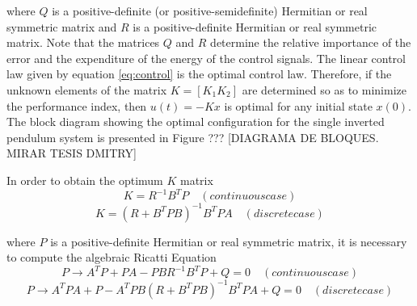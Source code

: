 where $Q$ is a positive-definite (or positive-semidefinite) Hermitian or real symmetric matrix and $R$ is a positive-definite Hermitian or real symmetric matrix. Note that the matrices $Q$ and $R$ determine the relative importance of the error and the expenditure of the energy of the control signals.
The linear control law given by equation \ref{eq:control} is the optimal control law. Therefore, if the unknown elements of the matrix $K = [K_1 K_2]$ are determined so as to minimize the performance index, then $u(t) = -Kx$ is optimal for any initial state $x(0)$. The block diagram showing the optimal configuration for the single inverted pendulum system is presented in Figure ??? [DIAGRAMA DE BLOQUES. MIRAR TESIS DMITRY]

In order to obtain the optimum $K$ matrix
\begin{equation}
K = R^{-1}B^{T}P \quad (continuous case)
\end{equation}
\begin{equation}
K = (R + B^{T}PB)^{-1}B^{T}PA \quad (discrete case)
\end{equation}


where $P$ is a positive-definite Hermitian or real symmetric matrix, it is necessary to compute the algebraic Ricatti Equation 
\begin{equation}
P \rightarrow A^{T}P+PA-PBR^{-1}B^{T}P+Q = 0 \quad (continuous case)
\end{equation}
\begin{equation}
P \rightarrow A^{T}PA+P-A^{T}PB(R+B^{T}PB)^{-1}B^{T}PA+Q = 0 \quad (discrete case)
\end{equation}











